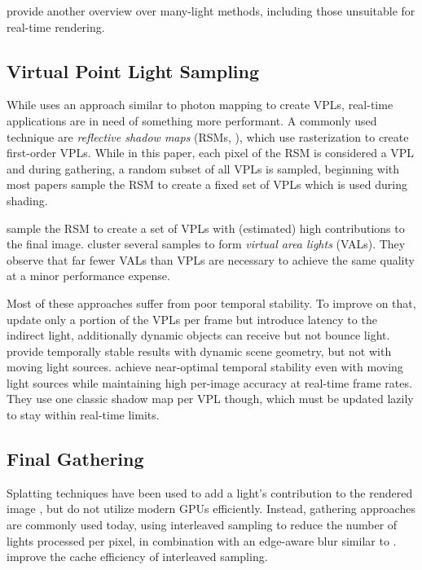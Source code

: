 \citet{Dachsbacher:2014:ManyLightsSTAR} provide another overview over many-light methods, including those unsuitable for real-time rendering.


\subsection{Virtual Point Light Sampling}
\label{sec:intro:relatedWorkManyLight:vplSampling}

While \citet{Keller:1997:InstantRadiosity} uses an approach similar to photon mapping to create VPLs, real-time applications are in need of something more performant. A commonly used technique are \emph{reflective shadow maps} (RSMs, \cite{Dachsbacher:2005:RSM}), which use rasterization to create first-order VPLs. While in this paper, each pixel of the RSM is considered a VPL and during gathering, a random subset of all VPLs is sampled, beginning with \citet{dachsbacher2006splatting} most papers sample the RSM to create a fixed set of VPLs which is used during shading.

\citet{georgiev2010simple, ritschel2011ismsViewAdaptive} sample the RSM to create a set of VPLs with (estimated) high contributions to the final image. \citet{dong2009real, prutkin2012reflective} cluster several samples to form \emph{virtual area lights} (VALs). They observe that far fewer VALs than VPLs are necessary to achieve the same quality at a minor performance expense.

Most of these approaches suffer from poor temporal stability. To improve on that, \citet{laine2007incremental} update only a portion of the VPLs per frame but introduce latency to the indirect light, additionally dynamic objects can receive but not bounce light. \citet{barak2013temporally} provide temporally stable results with dynamic scene geometry, but not with moving light sources. \citet{hedman2016sequential} achieve near-optimal temporal stability even with moving light sources while maintaining high per-image accuracy at real-time frame rates. They use one classic shadow map per VPL though, which must be updated lazily to stay within real-time limits.


\subsection{Final Gathering}
\label{sec:intro:relatedWorkManyLight:finalGathering}

Splatting techniques have been used to add a light's contribution to the rendered image \citep{dachsbacher2006splatting, Nichols:2009:splatting}, but do not utilize modern GPUs efficiently. Instead, gathering approaches are commonly used today, using interleaved sampling \citep{Keller:2001:InterleavedSampling} to reduce the number of lights processed per pixel, in combination with an edge-aware blur similar to \citet{laine2007incremental}. \citet{segovia2006non} improve the cache efficiency of interleaved sampling.


